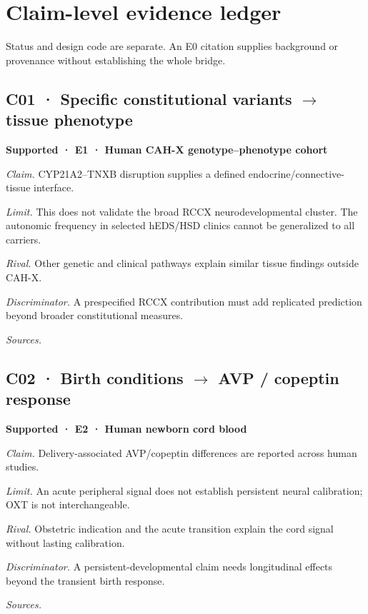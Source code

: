\appendix
\section{Claim-level evidence ledger}
Status and design code are separate. An E0 citation supplies background or provenance without establishing the whole bridge.
\subsection*{C01 · Specific constitutional variants \ensuremath{\rightarrow} tissue phenotype}
\noindent\textbf{Supported · E1 · Human CAH-X genotype–phenotype cohort}\par
\textit{Claim.} CYP21A2–TNXB disruption supplies a defined endocrine/connective-tissue interface.\par
\textit{Limit.} This does not validate the broad RCCX neurodevelopmental cluster. The autonomic frequency in selected hEDS/HSD clinics cannot be generalized to all carriers.\par
\textit{Rival.} Other genetic and clinical pathways explain similar tissue findings outside CAH-X.\par
\textit{Discriminator.} A prespecified RCCX contribution must add replicated prediction beyond broader constitutional measures.\par
\textit{Sources.} \cite{ref13,projP1,ref22,ref33}\par
\subsection*{C02 · Birth conditions \ensuremath{\rightarrow} AVP / copeptin response}
\noindent\textbf{Supported · E2 · Human newborn cord blood}\par
\textit{Claim.} Delivery-associated AVP/copeptin differences are reported across human studies.\par
\textit{Limit.} An acute peripheral signal does not establish persistent neural calibration; OXT is not interchangeable.\par
\textit{Rival.} Obstetric indication and the acute transition explain the cord signal without lasting calibration.\par
\textit{Discriminator.} A persistent-developmental claim needs longitudinal effects beyond the transient birth response.\par
\textit{Sources.} \cite{ref1,ref2}\par

